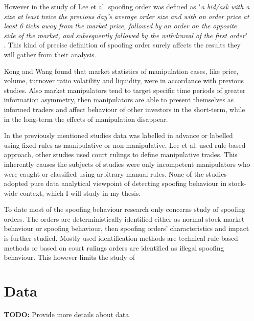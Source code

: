 \documentclass{tut-thesis}
\begin{document}
However in the study of Lee et al. spoofing order was defined as "\textit{a bid/ask with a size at least twice the previous day’s average order size and with an order price at least 6 ticks away from the market price, followed by an order on the opposite side of the market, and subsequently followed by the withdrawal of the first order}" \autocite[p. 11]{LeeEomPark2009}. This kind of precise definition of spoofing order surely affects the results they will gather from their analysis. %

Kong and Wang \parencite*{KongWang2014} found that market statistics of manipulation cases, like price, volume, turnover ratio volatility and liquidity, were in accordance with previous studies. Also market manipulators tend to target specific time periods of greater information asymmetry, then manipulators are able to present themselves as informed traders and affect behaviour of other investors in the short-term, while in the long-term the effects of manipulation disappear. \autocite{KongWang2014}

In the previously mentioned studies data was labelled in advance or labelled using fixed rules as manipulative or non-manipulative. Lee et al. used rule-based approach, other studies used court rulings to define manipulative trades. This inherently causes the subjects of studies were only incompetent manipulators who were caught or classified using arbitrary manual rules. None of the studies adopted pure data analytical viewpoint of detecting spoofing behaviour in stock-wide context, which I will study in my thesis.

To date most of the spoofing behaviour research only concerns study of spoofing orders. The orders are deterministically identified either as normal stock market behaviour or spoofing behaviour, then spoofing orders' characteristics and impact is further studied. Mostly used identification methods are technical rule-based methods or based on court rulings orders are identified as illegal spoofing behaviour. This however limits the study of  


\section{Data}
\textbf{TODO:} Provide more details about data
\end{document}
